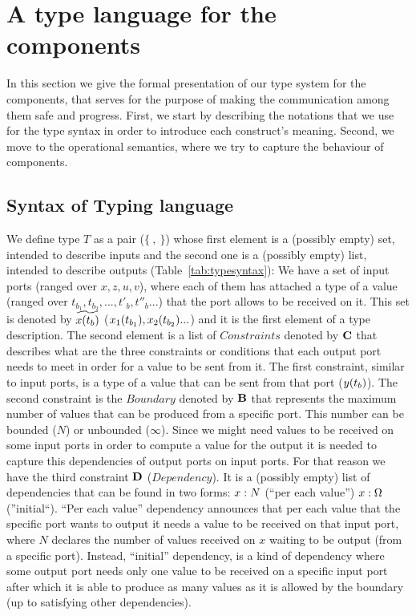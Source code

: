 \section{A type language for the components}

In this section we give the formal presentation of our type system for the components, that serves for the purpose of making the communication among them safe and progress. First, we start by describing the notations that we use for the type syntax in order to introduce each construct's meaning. Second, we move to the operational semantics, where we try to capture the behaviour of components.





\subsection{Syntax of Typing language} \label{Syntax of Typing language}

We define type $T$ as a pair ($\{\ ,\ \}$) whose first element is a (possibly empty) set, intended to describe inputs and the second one is a (possibly empty) list, intended to describe outputs (Table~\ref{tab:typesyntax}): We have a set of input ports (ranged over $x,z,u,v$), where each of them has attached a type of a value (ranged over $t_{b_1},t_{b_2},...,t'_{b},t''_{b}...$) that the port allows to be received on it. This set is denoted by $\widetilde{x(t_b)}$ ($x_1(t_{b_1}),x_2(t_{b_2})...$) and it is the first element of a type description. The second element is a list of $Constraints$ denoted by $\textbf{C}$ that describes what are the three constraints or conditions that each output port needs to meet in order for a value to be sent from it. The first constraint, similar to input ports, is a type of a value that can be sent from that port ($y(t_b)$). The second constraint is the $Boundary$ denoted by $\textbf{B}$ that represents the maximum number of values that can be produced from a specific port. This number can be bounded ($N$) or unbounded ($\infty$). Since we might need values to be received on some input ports in order to compute a value for the output it is needed to capture this dependencies of output ports on input ports. For that reason we have the third constraint $\textbf{D}$ ($Dependency$). It is a (possibly empty) list of dependencies that can be found in two forms: $x:N$ (``per each value'') $x:\Omega$ (''initial``). ``Per each value'' dependency announces that per each value that the specific port wants to output it needs a value to be received on that input port, where $N$ declares the number of values received on $x$ waiting to be output (from a specific port). Instead, ``initial'' dependency, is a kind of dependency where some output port needs only one value to be received on a specific input port after which it is able to produce as many values as it is allowed by the boundary (up to satisfying other dependencies).  

